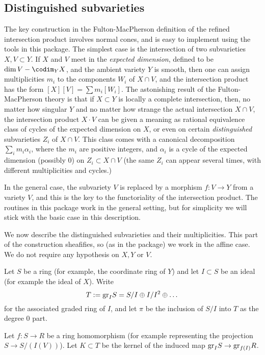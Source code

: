 \documentclass[twoside,12pt, leqno]{amsart}
\def\gr{{\rm gr}}
\begin{document}
\begin{normalsize}
     

\section{Distinguished subvarieties}%

The key construction in the Fulton-MacPherson definition of the refined intersection  product 
\cite[Section 6.1]{F}
involves normal cones, and is easy to implement using the tools in this package. The simplest case is the intersection of two subvarieties $X,V\subset Y$. If $X$ and $V$ meet in the \emph{expected dimension}, defined to be $\dim V - \codim_{Y} X$,
and the ambient variety $Y$ is smooth, then one can assign multiplicities $m_{i}$ to the components $W_{i}$ of $X\cap V$, and the 
intersection product has the form $[X][V] = \sum m_{i}[W_{i}].$
The astonishing result of the Fulton-MacPherson theory is that if $X\subset Y$ is locally a complete intersection, then, no matter how singular $Y$ and no matter how strange the actual intersection $X\cap V$, the intersection product 
$X\cdot V$ can be given a meaning as rational equivalence class of cycles of the expected dimension on $X$, or even on certain \emph{distinguished} subvarieties $Z_{i}$ of $X\cap V$. This class comes with a canonical decomposition $\sum_{i}m_{i}\alpha_{i}$, 
where the $m_{i}$ are positive integers, and $\alpha_{i}$ is a cycle of the expected dimension (possibly 0)
on  $Z_{i}\subset X\cap V$ (the same $Z_{i}$ can appear several times, with different multiplicities and cycles.)

In the general case, the subvariety $V$ is replaced by a morphism $f:V\to Y$ from a variety $V$, and this is the key to the functoriality of the intersection product. The routines in this package work in the general setting, but for simplicity we will stick with the basic case in this description.

We now describe the distinguished subvarieties and their multiplicities. This part of the construction sheafifies, so (as in the package) we work in the affine case. We do not require any hypothesis on $X, Y$ or $V$. 

Let $S$ be a ring (for example, the coordinate ring of $Y$) and let $I\subset S$ be an ideal (for example the ideal of $X$).
Write
$$
T:=\gr_{I}S = S/I\oplus I/I^{2}\oplus\dots
$$ 
for the associated graded ring  of $I$, and let
$\pi$ be the inclusion of $S/I$ into $T$ as the degree 0 part.

Let $f:S\to R$ be a ring homomorphism (for example representing the projection $S\to S/(I(V))$). Let $K\subset T$ be the kernel of the induced map $ \gr_{I}S \to \gr_{f(I)}R$.  


\end{normalsize}
\end{document}
